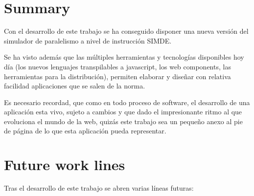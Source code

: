 
\section{Summary}
\label{8:sec:1}

Con el desarrollo de este trabajo se ha conseguido disponer una nueva versión
del simulador de paralelismo a nivel de instrucción SIMDE.

Se ha visto además que las múltiples herramientas y tecnologías disponibles hoy
día (los nuevos lenguajes transpilables a javascript, los web components, las 
herramientas para la distribución), permiten elaborar y diseñar con relativa
facilidad aplicaciones que se salen de la norma.

Es necesario recordad, que como en todo proceso de software, el desarrollo de una 
aplicación esta vivo, sujeto a cambios y que dado el impresionante ritmo al que
evoluciona el mundo de la web, quizás este trabajo sea un pequeño anexo al pie 
de página de lo que esta aplicación pueda representar.

\section{Future work lines}
\label{8:sec:2}

Tras el desarrollo de este trabajo se abren varias líneas futuras: 

